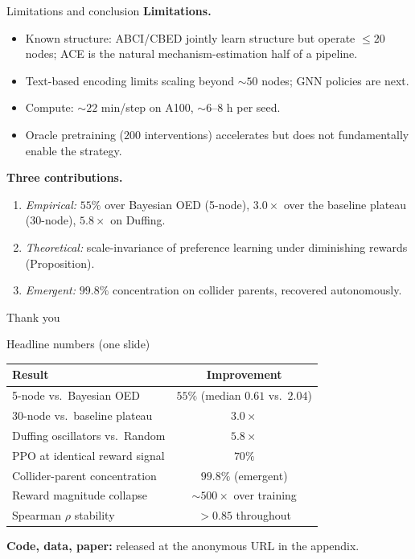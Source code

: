 \documentclass[aspectratio=169,10pt]{beamer}
\begin{document}
\begin{frame}{Limitations and conclusion}
\textbf{Limitations.}
\begin{itemize}
\item Known structure: ABCI/CBED jointly learn structure but operate $\le 20$ nodes;
      ACE is the natural mechanism-estimation half of a pipeline.
\item Text-based encoding limits scaling beyond $\sim 50$ nodes; GNN policies are next.
\item Compute: $\sim 22$ min/step on A100, $\sim 6$--$8$ h per seed.
\item Oracle pretraining ($200$ interventions) accelerates but does not fundamentally
      enable the strategy.
\end{itemize}
\medskip
\textbf{Three contributions.}
\begin{enumerate}
\item \emph{Empirical:} $55\%$ over Bayesian OED (5-node), $3.0\times$ over the baseline
      plateau (30-node), $5.8\times$ on Duffing.
\item \emph{Theoretical:} scale-invariance of preference learning under diminishing rewards
      (Proposition).
\item \emph{Emergent:} $99.8\%$ concentration on collider parents, recovered autonomously.
\end{enumerate}
\end{frame}

\begin{frame}[standout]
Thank you
\end{frame}

\begin{frame}{Headline numbers (one slide)}
\centering
\large
\begin{tabular}{@{}lc@{}}
\toprule
Result & Improvement \\
\midrule
5-node vs.\ Bayesian OED          & $55\%$  (median $0.61$ vs.\ $2.04$) \\
30-node vs.\ baseline plateau     & $3.0\times$ \\
Duffing oscillators vs.\ Random   & $5.8\times$ \\
PPO at identical reward signal    & $70\%$ \\
\midrule
Collider-parent concentration     & $99.8\%$ (emergent) \\
Reward magnitude collapse         & $\sim 500\times$ over training \\
Spearman $\rho$ stability          & $> 0.85$ throughout \\
\bottomrule
\end{tabular}
\vspace{0.6em}
\flushleft
\small
\textbf{Code, data, paper:} released at the anonymous URL in the appendix.
\end{frame}
\end{document}
